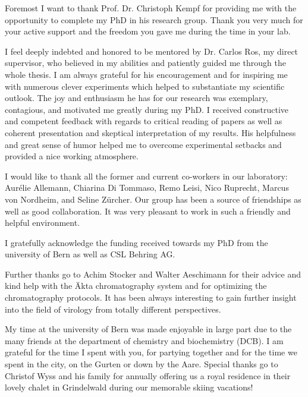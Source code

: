 \begin{addmargin}{0.025\textwidth}
\noindent
Foremost I want to thank Prof. Dr. Christoph Kempf for providing me with the opportunity to complete my PhD in his research group. Thank you very much for your active support and the freedom you gave me during the time in your lab.  

\par\medskip 
\noindent
I feel deeply indebted and honored to be mentored by Dr. Carlos Ros, my direct supervisor, who believed in my abilities and patiently guided me through the whole thesis. I am always grateful for his encouragement and for inspiring me with numerous clever experiments which helped to substantiate my scientific outlook. The joy and enthusiasm he has for our research was exemplary, contagious, and motivated me greatly during my PhD. I received constructive and competent feedback with regards to critical reading of papers as well as coherent presentation and skeptical interpretation of my results. His helpfulness and great sense of humor helped me to overcome experimental setbacks and provided a nice working atmosphere.    
    
\par\medskip 
\noindent
I would like to thank all the former and current co-workers in our laboratory: Aurélie Allemann, Chiarina Di Tommaso, Remo Leisi, Nico Ruprecht, Marcus von Nordheim, and Seline Zürcher. Our group has been a source of friendships as well as good collaboration. It was very pleasant to work in such a friendly and helpful environment. 

\par\medskip 
\noindent
I gratefully acknowledge the funding received towards my PhD from the university of Bern as well as CSL Behring AG.

\par\medskip 
\noindent
Further thanks go to Achim Stocker and Walter Aeschimann for their advice and kind help with the Äkta chromatography system and for optimizing the chromatography protocols. It has been always interesting to gain further insight into the field of virology from totally different perspectives.      

\par\medskip 
\noindent
My time at the university of Bern was made enjoyable in large part due to the many friends at the department of chemistry and biochemistry (DCB). I am grateful for the time I spent with you, for partying together and for the time we spent in the city, on the Gurten or down by the Aare. Special thanks go to Christof Wyss and his family for annually offering us a royal residence in their lovely chalet in Grindelwald during our memorable skiing vacations! 


\end{addmargin}
